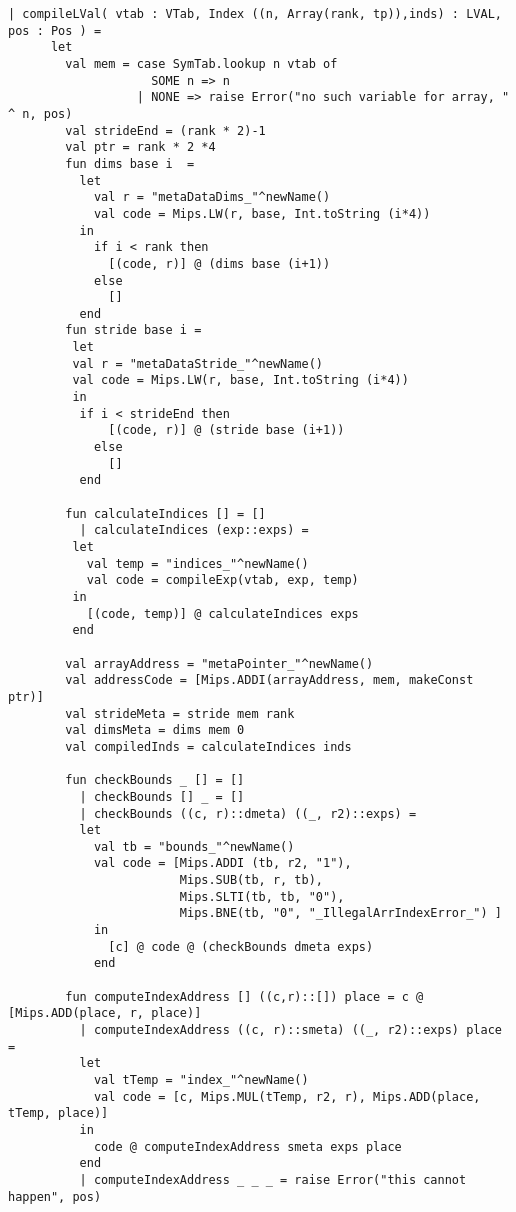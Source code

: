 \begin{lstlisting}[style=MLStyle, caption=Implementation of indexing for the compiler]
	| compileLVal( vtab : VTab, Index ((n, Array(rank, tp)),inds) : LVAL, pos : Pos ) =
      let 
        val mem = case SymTab.lookup n vtab of 
                    SOME n => n
                  | NONE => raise Error("no such variable for array, " ^ n, pos)
        val strideEnd = (rank * 2)-1
        val ptr = rank * 2 *4
        fun dims base i  = 
          let
            val r = "metaDataDims_"^newName()
            val code = Mips.LW(r, base, Int.toString (i*4))
          in
            if i < rank then
              [(code, r)] @ (dims base (i+1))
            else
              []
          end
        fun stride base i =
         let
         val r = "metaDataStride_"^newName() 
         val code = Mips.LW(r, base, Int.toString (i*4))
         in
          if i < strideEnd then
              [(code, r)] @ (stride base (i+1))
            else
              []
          end

        fun calculateIndices [] = []
          | calculateIndices (exp::exps) =
         let 
           val temp = "indices_"^newName()
           val code = compileExp(vtab, exp, temp)
         in
           [(code, temp)] @ calculateIndices exps
         end

        val arrayAddress = "metaPointer_"^newName()
        val addressCode = [Mips.ADDI(arrayAddress, mem, makeConst ptr)]
        val strideMeta = stride mem rank          
        val dimsMeta = dims mem 0 
        val compiledInds = calculateIndices inds

        fun checkBounds _ [] = []
          | checkBounds [] _ = []
          | checkBounds ((c, r)::dmeta) ((_, r2)::exps) =
          let
            val tb = "bounds_"^newName()
            val code = [Mips.ADDI (tb, r2, "1"), 
                        Mips.SUB(tb, r, tb), 
                        Mips.SLTI(tb, tb, "0"), 
                        Mips.BNE(tb, "0", "_IllegalArrIndexError_") ]
            in
              [c] @ code @ (checkBounds dmeta exps)
            end

        fun computeIndexAddress [] ((c,r)::[]) place = c @ [Mips.ADD(place, r, place)] 
          | computeIndexAddress ((c, r)::smeta) ((_, r2)::exps) place =
          let
            val tTemp = "index_"^newName()
            val code = [c, Mips.MUL(tTemp, r2, r), Mips.ADD(place, tTemp, place)] 
          in
            code @ computeIndexAddress smeta exps place
          end
          | computeIndexAddress _ _ _ = raise Error("this cannot happen", pos)


\end{lstlisting}
